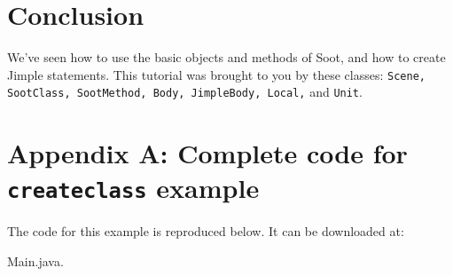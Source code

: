 \documentclass{article}
\begin{document}
\section{Conclusion}

We've seen how to use the basic objects and methods of
Soot, and how to create Jimple statements.  This tutorial was
brought to you by these classes: {\tt Scene, SootClass, SootMethod,
Body, JimpleBody, Local,} and {\tt Unit}.

\section*{Appendix A: Complete code for {\tt createclass} example}

The code for this example is reproduced below. It can be downloaded
at:

{Main.java}.
\end{document}
